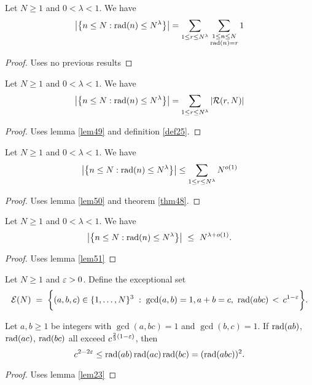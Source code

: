 \begin{lemma} \label{lem49} 
Let $N\ge1$ and $0<\lambda<1$. We have
\[
\big|\big\{n\le N : \operatorname{rad}(n) \le N^{\lambda}\big\}\big| = \sum_{1\le r\le N^{\lambda}}\sum_{\substack{1\le n\le N \\ \operatorname{rad}(n) = r}}1
\]
\end{lemma}
\begin{proof}\leanok
{}
Uses no previous results
\end{proof}

\begin{lemma} \label{lem50} 
Let $N\ge1$ and $0<\lambda<1$. We have
\[
\big|\big\{n\le N : \operatorname{rad}(n) \le N^{\lambda}\big\}\big| = \sum_{1\le r\le N^{\lambda}}|\mathcal R(r,N)|
\]
\end{lemma}
\begin{proof}\leanok
{}
Uses lemma \ref{lem49} and definition \ref{def25}.
\end{proof}

\begin{lemma} \label{lem51} 
Let $N\ge1$ and $0<\lambda<1$. We have
\[
\big|\big\{n\le N : \operatorname{rad}(n) \le N^{\lambda}\big\}\big| \le \sum_{1\le r\le N^{\lambda}}N^{o(1)}
\]
\end{lemma}
\begin{proof}\leanok
{}
Uses lemma \ref{lem50} and theorem \ref{thm48}.
\end{proof}


\begin{theorem}\label{cor:rad}  \label{thm52} 
Let $N\ge1$ and $0<\lambda<1$. We have
\[
\big|\big\{n\le N : \operatorname{rad}(n) \le N^{\lambda}\big\}\big| \ \le \ N^{\lambda+o(1)}.
\]
\end{theorem}
\begin{proof}\leanok
{}
Uses lemma \ref{lem51}
\end{proof}

\begin{definition}  \label{def53} \leanok
Let $N\ge1$ and $\varepsilon>0$. Define the exceptional set
\[
\mathcal E(N) \; = \; \bigg\{(a,b,c)\in \{1,\ldots,N\}^3 \;:\; \gcd(a,b)=1, a+b=c, \ \operatorname{rad}(abc) \, < \, c^{1-\varepsilon}
\bigg\}.
\]
\end{definition}

\begin{lemma} \label{lem54} 
Let $a,b\ge1$ be integers with $\gcd(a,bc)=1$ and $\gcd(b,c)=1$. If $\operatorname{rad}(ab)$, $\operatorname{rad}(ac)$, $\operatorname{rad}(bc)$ all exceed $c^{\frac{2}{3}(1-\varepsilon)}$, then
\[
c^{2-2\varepsilon}\le\operatorname{rad}(ab) \operatorname{rad}(ac)\operatorname{rad}(bc) = (\operatorname{rad}(abc))^2.
\]
\end{lemma}
\begin{proof}\leanok
{}
Uses lemma \ref{lem23}
\end{proof}

